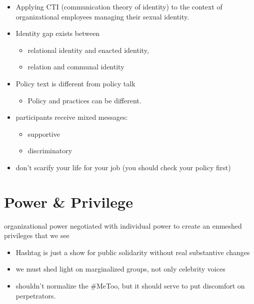\documentclass[
]{book}
\providecommand{\tightlist}{%
  \setlength{\itemsep}{0pt}\setlength{\parskip}{0pt}}
\begin{document}
\begin{itemize}
\item
  Applying CTI (communication theory of identity) to the context of organizational employees managing their sexual identity.
\item
  Identity gap exists between

  \begin{itemize}
  \item
    relational identity and enacted identity,
  \item
    relation and communal identity
  \end{itemize}
\item
  Policy text is different from policy talk

  \begin{itemize}
  \tightlist
  \item
    Policy and practices can be different.
  \end{itemize}
\item
  participants receive mixed messages:

  \begin{itemize}
  \item
    supportive
  \item
    discriminatory
  \end{itemize}
\item
  don't scarify your life for your job (you should check your policy first)
\end{itemize}

\hypertarget{power-privilege}{%
\chapter{Power \& Privilege}\label{power-privilege}}

organizational power negotiated with individual power to create an enmeshed privileges that we see

\citep{de_la_Garza_2020}

\begin{itemize}
\tightlist
\item
  Hashtag is just a show for public solidarity without real substantive changes
\item
  we must shed light on marginalized groups, not only celebrity voices
\item
  shouldn't normalize the \#MeToo, but it should serve to put discomfort on perpetrators.
\end{itemize}
\end{document}

